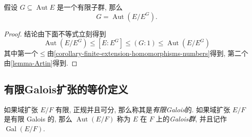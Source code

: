 \begin{theorem}
  \label{theorem-automorphism-finite-subgroup}
  假设 \( G \subseteq \operatorname{Aut} E \) 是一个有限子群, 那么
  \[
    G = \operatorname{Aut} (E / E^G).
  \]
\end{theorem}
\begin{proof}
  结论由下面不等式立刻得到
  \[
    \operatorname{Aut}(E/E^G) \leq [E : E^G] \leq (G: 1) \leq \operatorname{Aut}(E/E^G)
  \]
  其中第一个\( \leq
  \)由\cref{corollary-finite-extension-homomorphisms-numbers}得到,
  第二个由\cref{lemma-Artin}得到.
\end{proof}

\subsection{有限Galois扩张的等价定义}

如果域扩张 \( E / F \) 有限, 正规并且可分, 那么称其是\emph{有限Galois}的.
如果域扩张 \( E / F \) 是有限 Galois 的, 那么 \( \operatorname{Aut}(E/F) \) 称为
\( E \) 在 \( F \) 上的\emph{Galois群}, 并且记作 \( \operatorname{Gal}(E/F) \).

